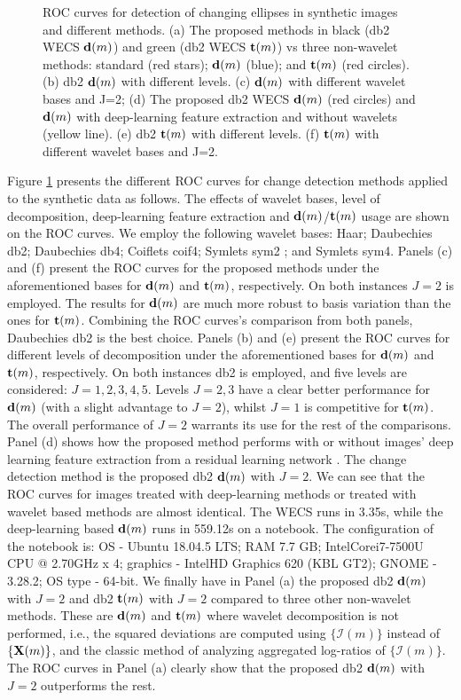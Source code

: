 \documentclass[journal]{IEEEtran}
\newcommand{\vd}{{\textbf d}}
\newcommand{\vX}{{\textbf X}}
\newcommand{\vt}{{\textbf t}}
\begin{document}
\begin{figure}[htp!]
\caption{ROC curves for detection of changing ellipses in synthetic images and different methods. (a) The proposed methods in black (db2 WECS $\vd(m)$) and green (db2 WECS $\vt(m)$) vs three non-wavelet methods: standard (red stars); $\vd(m)$ (blue); and $\vt(m)$ (red circles). 
(b) db2 $\vd(m)$ with different levels.
(c) $\vd(m)$ with different wavelet bases and J=2;
(d) The proposed db2 WECS $\vd(m)$ (red circles) and $\vd(m)$ with deep-learning feature extraction and without wavelets (yellow line).  
(e) db2 $\vt(m)$ with different levels. (f) $\vt(m)$ with different wavelet bases and J=2. }
\label{F:EllipsoidChanges_details}
\end{figure}

Figure \ref{F:EllipsoidChanges_details} presents the different ROC curves for change detection methods applied to the synthetic data as follows. The effects of wavelet bases, level of decomposition, deep-learning feature extraction and $\vd(m)$/$\vt(m)$ usage are shown on the ROC curves. We employ the following wavelet bases: Haar;  Daubechies db2; Daubechies db4; Coiflets coif4; Symlets sym2 ; and Symlets sym4. Panels (c) and (f) present the ROC curves for the proposed methods under the aforementioned bases for $\vd(m)$ and $\vt(m)$, respectively. On both instances $J=2$ is employed. The results for $\vd(m)$ are much more robust to basis variation than the ones for $\vt(m)$. Combining the ROC curves's comparison from both panels, Daubechies db2 is the best choice.  Panels (b) and (e) present the ROC curves for different levels of decomposition under the aforementioned bases for $\vd(m)$ and $\vt(m)$, respectively. On both instances db2 is employed, and five levels are considered: $J=1,2,3,4,5$. Levels $J=2,3$ have a clear better performance for $\vd(m)$ (with a slight advantage to $J=2$), whilst $J=1$ is competitive for $\vt(m)$. The overall performance  of $J=2$ warrants its use for the rest of the comparisons. Panel (d) shows how the proposed method performs with or without images' deep learning feature extraction from a residual learning network \cite{zhang2017beyond}. The change detection method is the proposed db2 $\vd(m)$ with $J=2$. We can see that the ROC curves for images treated with deep-learning methods or treated with wavelet based methods are almost identical. The WECS runs in 3.35s, while the deep-learning based $\vd(m)$ runs in 559.12s on a notebook. The configuration of the notebook is: OS - Ubuntu 18.04.5 LTS; RAM 7.7 GB; Intel\textregistered Core\texttrademark $ $i7-7500U CPU @ 2.70GHz x 4; graphics - Intel\textregistered HD Graphics 620 (KBL GT2); GNOME - 3.28.2; OS type - 64-bit. We finally have in Panel (a) the proposed db2 $\vd(m)$ with $J=2$ and db2 $\vt(m)$ with $J=2$  compared to three other non-wavelet methods. These are $\vd(m)$ and $\vt(m)$ where wavelet decomposition is not performed, i.e., the squared deviations are computed using $\{\mathcal{I}(m)\}$ instead of $\{\vX(m)\}$, and the classic method of analyzing aggregated log-ratios of $\{\mathcal{I}(m)\}$. The ROC curves in Panel (a) clearly show that  the proposed db2 $\vd(m)$ with $J=2$ outperforms the rest. 
\end{document}
